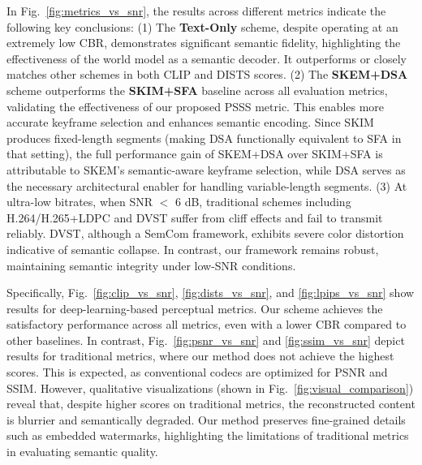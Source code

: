 \documentclass[10pt,journal]{IEEEtran}
\begin{document}
In Fig.~\ref{fig:metrics_vs_snr}, the results across different metrics indicate the following key conclusions:
(1) The \textbf{Text-Only} scheme, despite operating at an extremely low CBR, demonstrates significant semantic fidelity, highlighting the effectiveness of the world model as a semantic decoder. It outperforms or closely matches other schemes in both CLIP and DISTS scores. 
(2) The \textbf{SKEM+DSA} scheme outperforms the \textbf{SKIM+SFA} baseline across all evaluation metrics, validating the effectiveness of our proposed PSSS metric. This enables more accurate keyframe selection and enhances semantic encoding. Since SKIM produces fixed-length segments (making DSA functionally equivalent to SFA in that setting), the full performance gain of SKEM+DSA over SKIM+SFA is attributable to SKEM's semantic-aware keyframe selection, while DSA serves as the necessary architectural enabler for handling variable-length segments.
(3) At ultra-low bitrates, when SNR $<$ 6 dB, traditional schemes including H.264/H.265+LDPC and DVST suffer from cliff effects and fail to transmit reliably. DVST, although a SemCom framework, exhibits severe color distortion indicative of semantic collapse. In contrast, our framework remains robust, maintaining semantic integrity under low-SNR conditions.


Specifically, Fig.~\ref{fig:clip_vs_snr}, \ref{fig:dists_vs_snr}, and \ref{fig:lpips_vs_snr} show results for deep-learning-based perceptual metrics. Our scheme achieves the satisfactory performance across all metrics, even with a lower CBR compared to other baselines. In contrast, Fig.~\ref{fig:psnr_vs_snr} and \ref{fig:ssim_vs_snr} depict results for traditional metrics, where our method does not achieve the highest scores. This is expected, as conventional codecs are optimized for PSNR and SSIM. However, qualitative visualizations (shown in Fig.~\ref{fig:visual_comparison}) reveal that, despite higher scores on traditional metrics, the reconstructed content is blurrier and semantically degraded. Our method preserves fine-grained details such as embedded watermarks, highlighting the limitations of traditional metrics in evaluating semantic quality.
\end{document}
